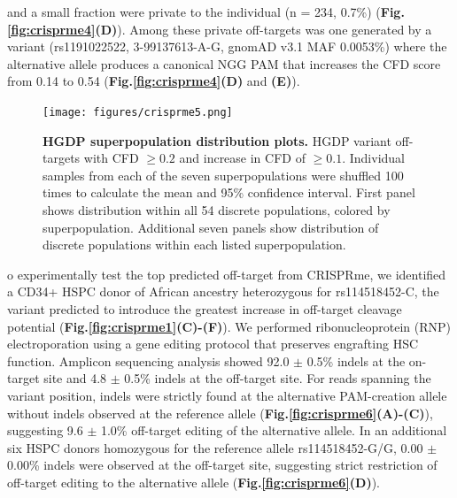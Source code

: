 \documentclass[a4paper, titlepage, openright]{book}
\begin{document}
and a small fraction were private to the individual (n = 234, 0.7\%) (\textbf{Fig.\ref{fig:crisprme4}(D)}).  Among these private off-targets was one generated by a variant (rs1191022522, 3-99137613-A-G, gnomAD v3.1 MAF 0.0053\%) where the alternative allele produces a canonical NGG PAM that increases the CFD score from 0.14 to 0.54 (\textbf{Fig.\ref{fig:crisprme4}(D)} and \textbf{(E)}).
\begin{figure}
	\centering
	\texttt{[image: figures/crisprme5.png]}
	\caption[HGDP superpopulation distribution plots]{\textbf{HGDP superpopulation distribution plots.} HGDP variant off-targets with CFD $\geq 0.2$ and increase in CFD of $\geq 0.1$.  Individual samples from each of the seven superpopulations were shuffled 100 times to calculate the mean and 95\% confidence interval. First panel shows distribution within all 54 discrete populations, colored by superpopulation. Additional seven panels show distribution of discrete populations within each listed superpopulation.}
	\label{fig:crisprme5}
\end{figure}
o experimentally test the top predicted off-target from CRISPRme, we identified a CD34+ HSPC donor of African ancestry heterozygous for rs114518452-C, the variant predicted to introduce the greatest increase in off-target cleavage potential (\textbf{Fig.\ref{fig:crisprme1}(C)-(F)}).  We performed ribonucleoprotein (RNP) electroporation using a gene editing protocol that preserves engrafting HSC function. Amplicon sequencing analysis showed 92.0 $\pm$ 0.5\% indels at the on-target site and 4.8 $\pm$ 0.5\% indels at the off-target site. For reads spanning the variant position, indels were strictly found at the alternative PAM-creation allele without indels observed at the reference allele (\textbf{Fig.\ref{fig:crisprme6}(A)-(C)}),  suggesting 9.6 $\pm$ 1.0\% off-target editing of the alternative allele. In an additional six HSPC donors homozygous for the reference allele rs114518452-G/G, 0.00 $\pm$ 0.00\% indels were observed at the off-target site, suggesting strict restriction of off-target editing to the alternative allele (\textbf{Fig.\ref{fig:crisprme6}(D)}).
\end{document}
